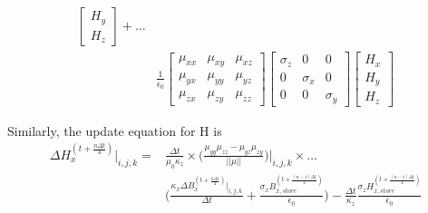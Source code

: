 \documentclass[]{article}
\begin{document}
\begin{align}
\begin{bmatrix}
				H_{y} \\[4pt]
				H_{z} 
			\end{bmatrix} + \dots \\ &
			\frac{1}{\epsilon_{0}}			
			\begin{bmatrix}
				\mu_{xx} & \mu_{xy} & \mu_{xz} \\[4pt]
				\mu_{yx} & \mu_{yy} & \mu_{yz} \\[4pt] 
				\mu_{zx} & \mu_{zy} & \mu_{zz}
			\end{bmatrix}
			\begin{bmatrix}
				\sigma_{z} & 0 & 0 \\[4pt]
				0 & \sigma_{x} & 0 \\[4pt] 
				0 & 0 & \sigma_{y}
			\end{bmatrix}
			\begin{bmatrix}
				H_{x} \\[4pt]
				H_{y} \\[4pt]
				H_{z} 
			\end{bmatrix}
		\end{align}
		
		Similarly, the update equation for H is
		\begin{align}
			\Delta H_{x}^{(t+\frac{n\Delta t}{4})}|_{i, j, k} = &
			\frac{\Delta t}{\mu_{0}\kappa_{z}}\times\bigg(\frac{\mu_{yy}\mu_{zz} - \mu_{yz}\mu_{zy}}{||\mu||}\bigg)\bigg|_{i, j, k}\times\dots \nonumber \\
			&\bigg(\frac{\kappa_{x}\Delta B_{x}^{(t+\frac{n\Delta t}{4})}|_{i, j, k}}{\Delta t} + \frac{\sigma_{x}B_{x, store}^{(t + \frac{(n-1)\Delta t}{4})}}{\epsilon_{0}}\bigg) - \frac{\Delta t}{\kappa_{z}}\frac{\sigma_{z}H_{x, store}^{(t + \frac{(n-1)\Delta t}{4})}}{\epsilon_{0}}
		\end{align}
\end{document}
